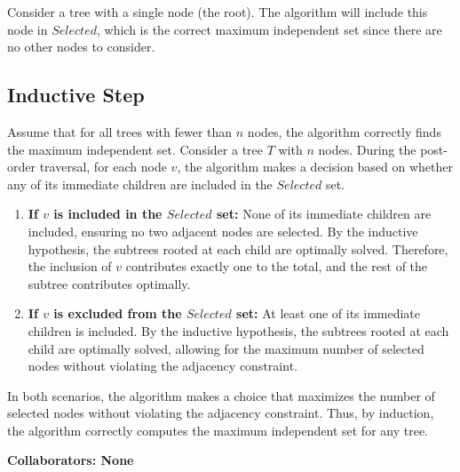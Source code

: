\documentclass[12pt]{article}
\begin{document}
Consider a tree with a single node (the root). The algorithm will include this node in $Selected$, which is the correct maximum independent set since there are no other nodes to consider.

\subsection*{Inductive Step}
Assume that for all trees with fewer than \( n \) nodes, the algorithm correctly finds the maximum independent set. Consider a tree \( T \) with \( n \) nodes. During the post-order traversal, for each node \( v \), the algorithm makes a decision based on whether any of its immediate children are included in the $Selected$ set.

\begin{enumerate}
    \item \textbf{If \( v \) is included in the $Selected$ set:}
    None of its immediate children are included, ensuring no two adjacent nodes are selected. By the inductive hypothesis, the subtrees rooted at each child are optimally solved. Therefore, the inclusion of \( v \) contributes exactly one to the total, and the rest of the subtree contributes optimally.
    
    \item \textbf{If \( v \) is excluded from the $Selected$ set:} At least one of its immediate children is included. By the inductive hypothesis, the subtrees rooted at each child are optimally solved, allowing for the maximum number of selected nodes without violating the adjacency constraint.
    
\end{enumerate}

In both scenarios, the algorithm makes a choice that maximizes the number of selected nodes without violating the adjacency constraint. Thus, by induction, the algorithm correctly computes the maximum independent set for any tree.

\vspace{1cm}

\noindent\textbf{Collaborators: None}
\end{document}
